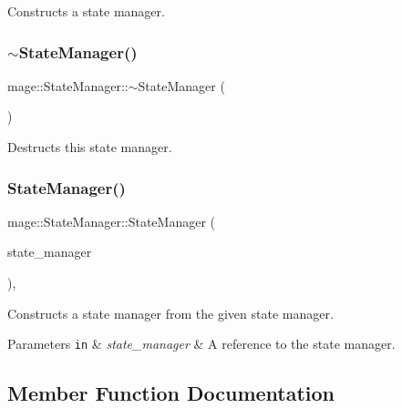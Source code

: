 Constructs a state manager. \hypertarget{classmage_1_1_state_manager_a1234b6c121a580eeec8f60611b4d16d4}{}\label{classmage_1_1_state_manager_a1234b6c121a580eeec8f60611b4d16d4} 
\subsubsection{\texorpdfstring{$\sim$\+State\+Manager()}{~StateManager()}}
{\footnotesize\ttfamily mage\+::\+State\+Manager\+::$\sim$\+State\+Manager (\begin{DoxyParamCaption}{ }\end{DoxyParamCaption})\hspace{0.3cm}{\ttfamily [virtual]}}

Destructs this state manager. \hypertarget{classmage_1_1_state_manager_a1921a9b055fab1c7efae18e15b54191b}{}\label{classmage_1_1_state_manager_a1921a9b055fab1c7efae18e15b54191b} 
\subsubsection{\texorpdfstring{State\+Manager()}{StateManager()}\hspace{0.1cm}{\footnotesize\ttfamily [2/2]}}
{\footnotesize\ttfamily mage\+::\+State\+Manager\+::\+State\+Manager (\begin{DoxyParamCaption}\item[{const \hyperlink{classmage_1_1_state_manager}{State\+Manager} \&}]{state\+\_\+manager }\end{DoxyParamCaption})\hspace{0.3cm}{\ttfamily [private]}, {\ttfamily [delete]}}

Constructs a state manager from the given state manager.


\begin{DoxyParams}[1]{Parameters}
\mbox{\tt in}  & {\em state\+\_\+manager} & A reference to the state manager. \\
\hline
\end{DoxyParams}


\subsection{Member Function Documentation}
\hypertarget{classmage_1_1_state_manager_ae5711ea7782384bc52b09a14cf1f3f5d}{}\label{classmage_1_1_state_manager_ae5711ea7782384bc52b09a14cf1f3f5d} 
